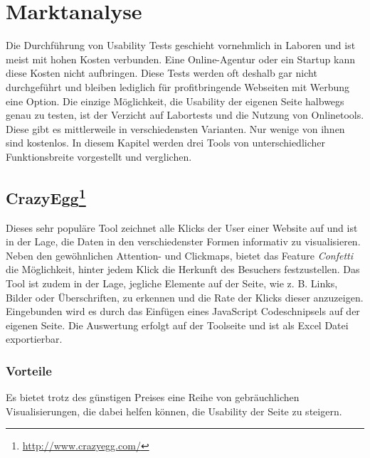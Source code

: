 %
%
%
%

\section{Marktanalyse}

Die Durchführung von Usability Tests geschieht vornehmlich in Laboren und ist meist mit hohen Kosten verbunden. Eine Online-Agentur oder ein Startup kann diese Kosten nicht aufbringen. Diese Tests werden oft deshalb gar nicht durchgeführt und bleiben lediglich für profitbringende Webseiten mit Werbung eine Option. Die einzige Möglichkeit, die Usability der eigenen Seite halbwegs genau zu testen, ist der Verzicht auf Labortests und die Nutzung von Onlinetools. Diese gibt es mittlerweile in verschiedensten Varianten. Nur wenige von ihnen sind kostenlos. In diesem Kapitel werden drei Tools von unterschiedlicher Funktionsbreite vorgestellt und verglichen.

\subsection*{CrazyEgg\footnote{\url{http://www.crazyegg.com/}}}

Dieses sehr populäre Tool zeichnet alle Klicks der User einer Website auf und ist in der Lage, die Daten in den verschiedenster Formen informativ zu visualisieren. Neben den gewöhnlichen Attention- und Clickmaps, bietet das Feature \textit{Confetti} die Möglichkeit, hinter jedem Klick die Herkunft des Besuchers festzustellen. Das Tool ist zudem in der Lage, jegliche Elemente auf der Seite, wie z. B. Links, Bilder oder Überschriften, zu erkennen und die Rate der Klicks dieser anzuzeigen. Eingebunden wird es durch das Einfügen eines JavaScript Codeschnipsels auf der eigenen Seite. Die Auswertung erfolgt auf der Toolseite und ist als Excel Datei exportierbar.

\subsubsection*{Vorteile}
Es bietet trotz des günstigen Preises eine Reihe von gebräuchlichen Visualisierungen, die dabei helfen können, die Usability der Seite zu steigern.

